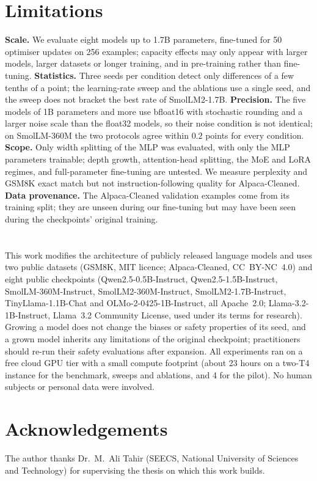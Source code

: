 \section*{Limitations}
\textbf{Scale.} We evaluate eight models up to 1.7B parameters, fine-tuned for 50 optimiser updates on 256 examples; capacity effects may only appear with larger models, larger datasets or longer training, and in pre-training rather than fine-tuning.
\textbf{Statistics.} Three seeds per condition detect only differences of a few tenths of a point; the learning-rate sweep and the ablations use a single seed, and the sweep does not bracket the best rate of SmolLM2-1.7B.
\textbf{Precision.} The five models of 1B parameters and more use bfloat16 with stochastic rounding and a larger noise scale than the float32 models, so their noise condition is not identical; on SmolLM-360M the two protocols agree within $0.2$ points for every condition.
\textbf{Scope.} Only width splitting of the MLP was evaluated, with only the MLP parameters trainable; depth growth, attention-head splitting, the MoE and LoRA regimes, and full-parameter fine-tuning are untested. We measure perplexity and GSM8K exact match but not instruction-following quality for Alpaca-Cleaned.
\textbf{Data provenance.} The Alpaca-Cleaned validation examples come from its training split; they are unseen during our fine-tuning but may have been seen during the checkpoints' original training.

\section*{\ethicsheading}
This work modifies the architecture of publicly released language models and uses two public datasets (GSM8K, MIT licence; Alpaca-Cleaned, CC~BY-NC~4.0) and eight public checkpoints (Qwen2.5-0.5B-Instruct, Qwen2.5-1.5B-Instruct, SmolLM-360M-Instruct, SmolLM2-360M-Instruct, SmolLM2-1.7B-Instruct, TinyLlama-1.1B-Chat and OLMo-2-0425-1B-Instruct, all Apache~2.0; Llama-3.2-1B-Instruct, Llama~3.2 Community License, used under its terms for research). Growing a model does not change the biases or safety properties of its seed, and a grown model inherits any limitations of the original checkpoint; practitioners should re-run their safety evaluations after expansion. All experiments ran on a free cloud GPU tier with a small compute footprint (about 23 hours on a two-T4 instance for the benchmark, sweeps and ablations, and 4 for the pilot). No human subjects or personal data were involved.

\ifdefined\FINAL\def\showacknowledgements{}\fi
\ifdefined\ARXIV\def\showacknowledgements{}\fi
\ifdefined\showacknowledgements
\section*{Acknowledgements}
The author thanks Dr.~M.~Ali Tahir (SEECS, National University of Sciences and Technology) for supervising the thesis on which this work builds.
\fi
